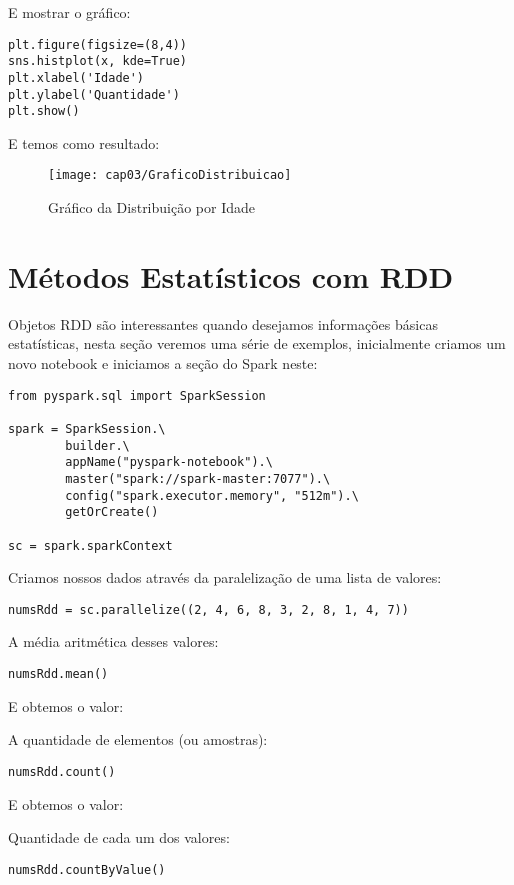 E mostrar o gráfico:
\begin{lstlisting}[]
plt.figure(figsize=(8,4))
sns.histplot(x, kde=True)
plt.xlabel('Idade')
plt.ylabel('Quantidade')
plt.show()
\end{lstlisting}

E temos como resultado:
\begin{figure}[H]
	\centering\texttt{[image: cap03/GraficoDistribuicao]}
	\caption{Gráfico da Distribuição por Idade}
\end{figure}

\section{Métodos Estatísticos com RDD}
Objetos RDD são interessantes quando desejamos informações básicas estatísticas, nesta seção veremos uma série de exemplos, inicialmente criamos um novo notebook e iniciamos a seção do Spark neste:
\begin{lstlisting}[]
from pyspark.sql import SparkSession

spark = SparkSession.\
        builder.\
        appName("pyspark-notebook").\
        master("spark://spark-master:7077").\
        config("spark.executor.memory", "512m").\
        getOrCreate()
        
sc = spark.sparkContext        
\end{lstlisting}

Criamos nossos dados através da paralelização de uma lista de valores:
\begin{lstlisting}[]
numsRdd = sc.parallelize((2, 4, 6, 8, 3, 2, 8, 1, 4, 7))
\end{lstlisting}

A média aritmética desses valores:
\begin{lstlisting}[]
numsRdd.mean()
\end{lstlisting}

E obtemos o valor: \\
{\ttfamily 4.5}

A quantidade de elementos (ou amostras):
\begin{lstlisting}[]
numsRdd.count()
\end{lstlisting}

E obtemos o valor: \\
{\ttfamily 10}

Quantidade de cada um dos valores:
\begin{lstlisting}[]
numsRdd.countByValue()
\end{lstlisting}

